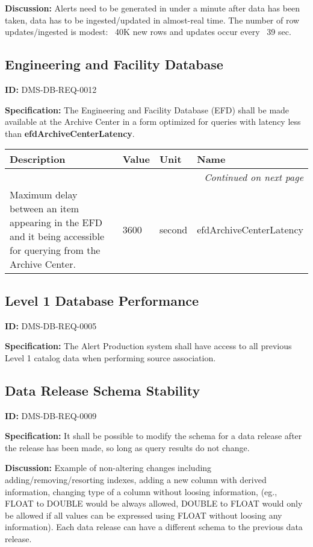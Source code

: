 \documentclass[toc]{lsstdoc}
\makeatletter
\newcommand{\paramname}[1]{\hspace{0pt}#1}
\newcommand{\unitname}[1]{\hspace{0pt}#1}
\newenvironment{parameters}[0]{%
\setlength\LTleft{0pt}
\setlength\LTright{\fill}
\begin{small}
\begin{longtable}[]{|p{0.49\textwidth}|l|p{0.6in}|p{1.70in}@{}|}

\hline \textbf{Description} & \textbf{Value} & \textbf{Unit} & \textbf{Name} \\ \hline
\endhead

\hline \multicolumn{4}{r}{\emph{Continued on next page}} \\
\endfoot

\hline\hline
\endlastfoot
}{%
\hline
\end{longtable}
\end{small}
}
\makeatother
\begin{document}
\textbf{Discussion:}
Alerts need to be generated in under a minute after data has been taken, data has to be ingested/updated in almost-real time. The number of row updates/ingested is modest: ~40K new rows and updates occur every ~39 sec.

\subsection{Engineering and Facility Database}

\label{DMS-DB-REQ-0012}
\textbf{ID:} DMS-DB-REQ-0012

\textbf{Specification:}
The Engineering and Facility Database (EFD) shall be made available at the Archive Center in a form optimized for queries with latency less than \textbf{efdArchiveCenterLatency}.

\begin{parameters}
Maximum delay between an item appearing in the EFD and it being accessible for querying from the Archive Center.
&
3600
&
\unitname{%
second
}
&
\paramname{%
efdArchiveCenterLatency
} \\\hline
\end{parameters}

\subsection{Level 1 Database Performance}

\label{DMS-DB-REQ-0005}
\textbf{ID:} DMS-DB-REQ-0005

\textbf{Specification:}
The Alert Production system shall have access to all previous Level 1 catalog data when performing source association.

\subsection{Data Release Schema Stability}

\label{DMS-DB-REQ-0009}
\textbf{ID:} DMS-DB-REQ-0009

\textbf{Specification:}
It shall be possible to modify the schema for a data release after the release has been made, so long as query results do not change.

\textbf{Discussion:}
Example of non-altering changes including adding/removing/resorting indexes, adding a new column with derived information, changing type of a column without loosing information, (eg., FLOAT to DOUBLE would be always allowed, DOUBLE to FLOAT would only be allowed if all values can be expressed using FLOAT without loosing any information). Each data release can have a different schema to the previous data release.
\end{document}
